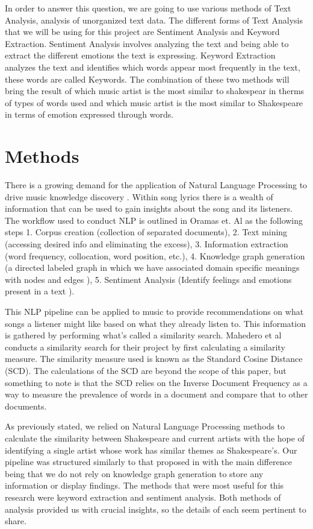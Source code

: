\documentclass[11pt]{article}
\begin{document}
In order to answer this question, we are going to use various methods of Text Analysis, analysis of unorganized text data\cite{monkey}. The different forms of Text Analysis that we will be using for this project are Sentiment Analysis and Keyword Extraction. Sentiment Analysis involves analyzing the text and being able to extract the different emotions the text is expressing\cite{monkey}. Keyword Extraction analyzes the text and identifies which words appear most frequently in the text, these words are called Keywords\cite{monkey}. The combination of these two methods will bring the result of which music artist is the most similar to shakespear in therms of types of words used and which music artist is the most similar to Shakespeare in terms of emotion expressed through words.  

\section{Methods}
There is a growing demand for the application of Natural Language Processing to drive music knowledge discovery \cite{NLP-for-lyrics}. Within song lyrics there is a wealth of information that can be used to gain insights about the song and its listeners. The workflow used to conduct NLP is outlined in Oramas et. Al \cite{NLP-for-music} as the following steps 1. Corpus creation (collection of separated documents), 2. Text mining (accessing desired info and eliminating the excess), 3. Information extraction (word frequency, collocation, word position, etc.), 4. Knowledge graph generation (a directed labeled graph in which we have associated domain specific meanings with nodes and edges \cite{knowledge-graphs}), 5. Sentiment Analysis (Identify feelings and emotions present in a text \cite{monkey}).
 
This NLP pipeline can be applied to music to provide recommendations on what songs a listener might like based on what they already listen to. \cite{NLP-for-lyrics} This information is gathered by performing what’s called a similarity search. Mahedero et al \cite{NLP-for-lyrics} conducts a similarity search for their project by first calculating a similarity measure. The similarity measure used is known as the Standard Cosine Distance (SCD). The calculations of the SCD are beyond the scope of this paper, but something to note is that the SCD relies on the Inverse Document Frequency as a way to measure the prevalence of words in a document and compare that to other documents. 

As previously stated, we relied on Natural Language Processing methods to calculate the similarity between Shakespeare and current artists with the hope of identifying a single artist whose work has similar themes as Shakespeare’s. Our pipeline was structured similarly to that proposed in \cite{NLP-for-music} with the main difference being that we do not rely on knowledge graph generation to store any information or display findings. The methods that were most useful for this research were keyword extraction and sentiment analysis. Both methods of analysis provided us with crucial insights, so the details of each seem pertinent to share. 
\end{document}
